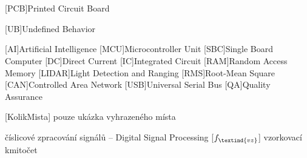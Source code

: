\cleardoublepage
\chapter*{\listofabbrevname}
{}

\begin{acronym}[KolikMista]

	[PCB]{Printed Circuit Board}

	[UB]{Undefined Behavior}

	[AI]{Artificial Intelligence}
	[MCU]{Microcontroller Unit}
	[SBC]{Single Board Computer}
	[DC]{Direct Current}
	[IC]{Integrated Circuit}
	[RAM]{Random Access Memory}
	[LIDAR]{Light Detection and Ranging}
	[RMS]{Root-Mean Square}
	[CAN]{Controlled Area Network}
	[USB]{Universal Serial Bus}
	[QA]{Quality Assurance}

		[KolikMista]
		{pouze ukázka vyhrazeného místa}

		{číslicové zpracování signálů -- Digital Signal Processing}
		[\ensuremath{f_\textind{vz}}] %
		{vzorkovací kmitočet}					%

\end{acronym}
